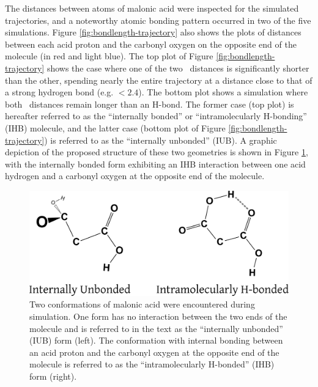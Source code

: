 The distances between atoms of malonic acid were inspected for the simulated trajectories, and a noteworthy atomic bonding pattern occurred in two of the five simulations. Figure \ref{fig:bondlength-trajectory} also shows the plots of distances between each acid proton and the carbonyl oxygen on the opposite end of the molecule (in red and light blue). The top plot of Figure \ref{fig:bondlength-trajectory} shows the case where one of the two \ocarbh~distances is significantly shorter than the other, spending nearly the entire trajectory at a distance close to that of a strong hydrogen bond (e.g. $< 2.4$\angs). The bottom plot shows a simulation where both \ocarbh~distances remain longer than an H-bond. The former case (top plot) is hereafter referred to as the ``internally bonded'' or ``intramolecularly H-bonding'' (IHB) molecule, and the latter case (bottom plot of Figure \ref{fig:bondlength-trajectory}) is referred to as the ``internally unbonded'' (IUB). A graphic depiction of the proposed structure of these two geometries is shown in Figure \ref{fig:structure}, with the internally bonded form exhibiting an IHB interaction between one acid hydrogen and a carbonyl oxygen at the opposite end of the molecule. 


\begin{figure}[h!]
	\begin{center}
		\includegraphics[scale=1.0]{images/bond-length/structure.png}
		\caption{Two conformations of malonic acid were encountered during simulation. One form has no interaction between the two ends of the molecule and is referred to in the text as the ``internally unbonded'' (IUB) form (left). The conformation with internal bonding between an acid proton and the carbonyl oxygen at the opposite end of the molecule is referred to as the ``intramolecularly H-bonded'' (IHB) form (right).}
		\label{fig:structure}
	\end{center}
\end{figure}

